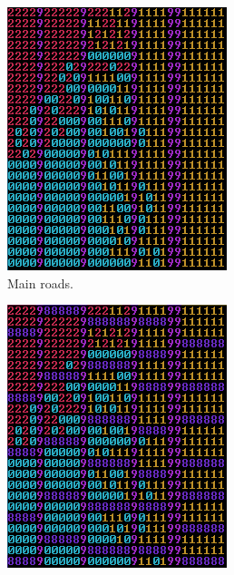 		\begin{figure}[h]
			\begin{subfigure}{0.5\textwidth}
				\centering
				\includegraphics[width=0.9\linewidth]{"Images/map main roads colored"}
				\caption{Main roads.}
				\label{fig:map-main-roads}
			\end{subfigure}
			\begin{subfigure}{0.5\textwidth}
				\centering
				\includegraphics[width=0.9\linewidth]{"Images/map small roads colored"}

\end{subfigure}
\end{figure}
